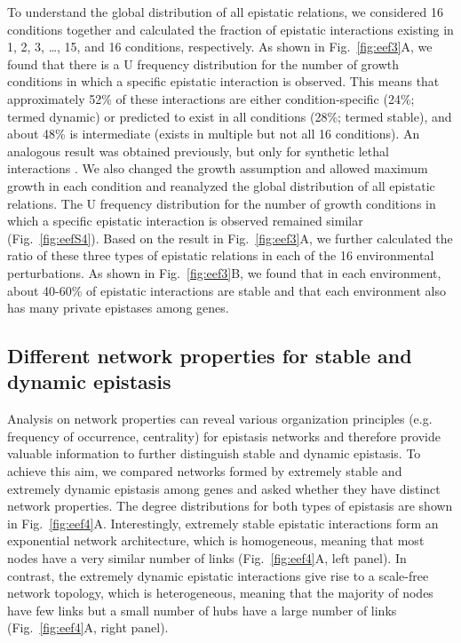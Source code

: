 \documentclass[10pt]{article}
\newcommand{\Fig}{Fig.}
\newcommand{\citep}{\cite}
\begin{document}
To understand the global distribution of all epistatic relations, we
considered 16 conditions together and calculated the fraction of
epistatic interactions existing in 1, 2, 3, \ldots, 15, and 16
conditions, respectively. As shown in \Fig~\ref{fig:eef3}A, we found that there is a
U frequency distribution for the number of growth conditions in which
a specific epistatic interaction is observed. This means that
approximately 52\% of these interactions are either condition-specific
(24\%; termed dynamic) or predicted to exist in all conditions (28\%;
termed stable), and about 48\% is intermediate (exists in multiple but not
all 16 conditions). An analogous result was obtained previously, but
only for synthetic lethal interactions \citep{Harrison2007}. We also changed the
growth assumption and allowed maximum growth in each condition and
reanalyzed the global distribution of all epistatic relations. The U
frequency distribution for the number of growth conditions in which a
specific epistatic interaction is observed remained similar
(\Fig~\ref{fig:eefS4}). Based on the result in \Fig~\ref{fig:eef3}A,
we further calculated the ratio of these three types of epistatic
relations in each of the 16 environmental perturbations. As shown in
\Fig~\ref{fig:eef3}B, we found that in
each environment, about 40-60\% of epistatic interactions are stable
and that each environment also has many private epistases among genes.



\subsection*{Different network properties for stable and dynamic epistasis}

Analysis on network properties can reveal various organization
principles (e.g. frequency of occurrence, centrality) for epistasis
networks \citep{Tong2004, Costanzo2010} and therefore provide valuable
information to further
distinguish stable and dynamic epistasis. To achieve this aim, we
compared networks formed by extremely stable and extremely dynamic
epistasis among genes and asked whether they have distinct network
properties. The degree distributions for both types of epistasis are
shown in \Fig~\ref{fig:eef4}A. Interestingly, extremely stable epistatic
interactions form an exponential network architecture, which is
homogeneous, meaning that most nodes have a very similar number of
links (\Fig~\ref{fig:eef4}A, left panel). In contrast, the extremely dynamic
epistatic interactions give rise to a scale-free network topology,
which is heterogeneous, meaning that the majority of nodes have few
links but a small number of hubs have a large number of links
(\Fig~\ref{fig:eef4}A, right panel).
\end{document}
